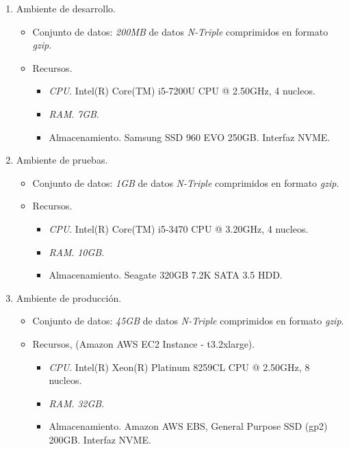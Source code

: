 \begin{enumerate}
    \item Ambiente de desarrollo.
    \begin{itemize}
        \item Conjunto de datos: \textit{200MB} de datos \textit{N-Triple} comprimidos en formato \textit{gzip}.
        \item Recursos.
        \begin{itemize}
            \item \textit{CPU}. Intel(R) Core(TM) i5-7200U CPU @ 2.50GHz, 4 nucleos.
            \item \textit{RAM}. \textit{7GB}.
            \item Almacenamiento. Samsung SSD 960 EVO 250GB. Interfaz NVME.
        \end{itemize}
    \end{itemize}
    \item Ambiente de pruebas.
    \begin{itemize}
        \item Conjunto de datos: \textit{1GB} de datos \textit{N-Triple} comprimidos en formato \textit{gzip}.
        \item Recursos.
        \begin{itemize}
            \item \textit{CPU}. Intel(R) Core(TM) i5-3470 CPU @ 3.20GHz, 4 nucleos.
            \item \textit{RAM}. \textit{10GB}.
            \item Almacenamiento. Seagate 320GB 7.2K SATA 3.5 HDD.
        \end{itemize}
    \end{itemize}
    \item Ambiente de producción.
    \begin{itemize}
        \item Conjunto de datos: \textit{45GB} de datos \textit{N-Triple} comprimidos en formato \textit{gzip}.
        \item Recursos, (Amazon AWS EC2 Instance - t3.2xlarge).
        \begin{itemize}
            \item \textit{CPU}. Intel(R) Xeon(R) Platinum 8259CL CPU @ 2.50GHz, 8 nucleos.
            \item \textit{RAM}. \textit{32GB}.
            \item Almacenamiento. Amazon AWS EBS, General Purpose SSD (gp2) 200GB. Interfaz NVME.
        \end{itemize}
    \end{itemize}
\end{enumerate}

